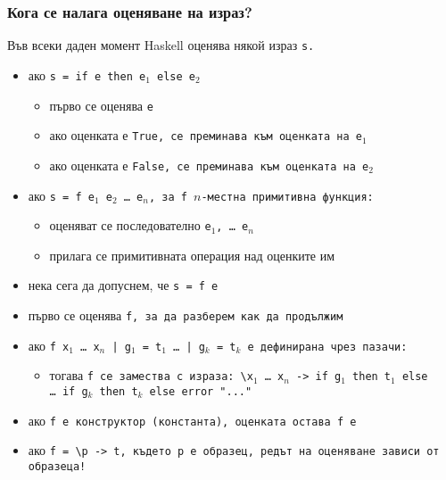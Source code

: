 \documentclass{beamer}
\begin{document}
\begin{frame}
  \frametitle{Кога се налага оценяване на израз?}
  Във всеки даден момент Haskell оценява някой израз \tt s. \pause
  \begin{itemize}[<+->]
  \item ако \tt{s = if e then e$_1$ else e$_2$}
    \begin{itemize}
    \item първо се оценява \tt e
    \item ако оценката е \tt{True}, се преминава към оценката на e$_1$
    \item ако оценката е \tt{False}, се преминава към оценката на e$_2$
    \end{itemize}
  \item ако \tt{s = f e$_1$ e$_2$ \ldots\ e$_n$}, за \tt f $n$-местна примитивна функция:
    \begin{itemize}
    \item оценяват се последователно \tt{e$_1$}, \ldots\ \tt{e$_n$}
    \item прилага се примитивната операция над оценките им
    \end{itemize}
  \item нека сега да допуснем, че \tt{s = f e}
  \item първо се оценява \tt f, за да разберем как да продължим
  \item ако \tt{f x$_1$ \ldots\ x$_n$ | g$_1$ = t$_1$ \ldots\ | g$_k$ = t$_k$} е дефинирана чрез пазачи:
    \begin{itemize}
    \item тогава \tt f се замества с израза: \tt{\textbackslash x$_1$ \ldots\ x$_n$ -> if g$_1$ then t$_1$ else \ldots\ if g$_k$ then t$_k$ else error "..."}

    \end{itemize}
  \item ако \tt f е конструктор (константа), \alert{оценката остава \tt{f e}}
  \item ако \tt{f = \textbackslash p -> t}, където \tt p е образец, редът на оценяване зависи от образеца!
  \end{itemize}
\end{frame}
\end{document}
